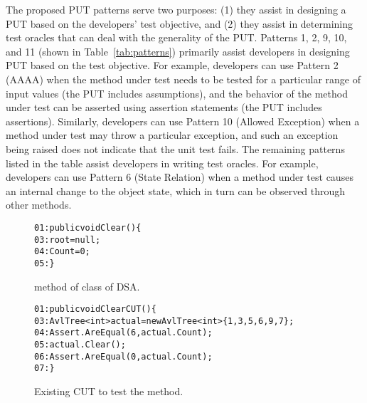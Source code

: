 The proposed PUT patterns serve two purposes: (1) they assist in designing a PUT based on the developers' test objective, and (2) they assist in determining test oracles that can deal with the generality of the PUT. Patterns 1, 2, 9, 10, and 11 (shown in Table~\ref{tab:patterns}) primarily assist developers in designing PUT based on the test objective. For example, developers can use Pattern 2 (AAAA) when the method under test needs to be tested for a particular range of input values (the PUT includes assumptions), and the behavior of the method under test can be asserted using assertion statements (the PUT includes assertions). Similarly, developers can use Pattern 10 (Allowed Exception) when a method under test may throw a particular exception, and such an exception being raised does not indicate that the unit test fails. 
The remaining patterns listed in the table assist developers in writing test oracles. For example, developers can use Pattern 6 (State Relation) when a method under test causes an internal change to the object state, which in turn can be observed through other methods. 

\begin{figure}
\begin{CodeOut}        
\begin{alltt}
01: public void Clear() \{
03: \hspace{0.07in}root = null;
04: \hspace{0.07in}Count = 0;
05: \}
\end{alltt}        
\end{CodeOut}\vspace*{-4ex}
\caption{ method of  class of DSA.}
\label{fig:pattern}%

\begin{CodeOut}        
\begin{alltt}
01: public void ClearCUT() \{
03: \hspace{0.07in}AvlTree<int> actual = new AvlTree<int>\{1,3,5,6,9,7\};
04: \hspace{0.07in}Assert.AreEqual(6, actual.Count);
05: \hspace{0.07in}actual.Clear();
06: \hspace{0.07in}Assert.AreEqual(0, actual.Count);            
07: \}
\end{alltt}
\end{CodeOut}\vspace*{-4ex}
\caption{Existing CUT to test the  method.} \vspace*{-4ex}
\label{fig:patternCUT}%
\end{figure}

